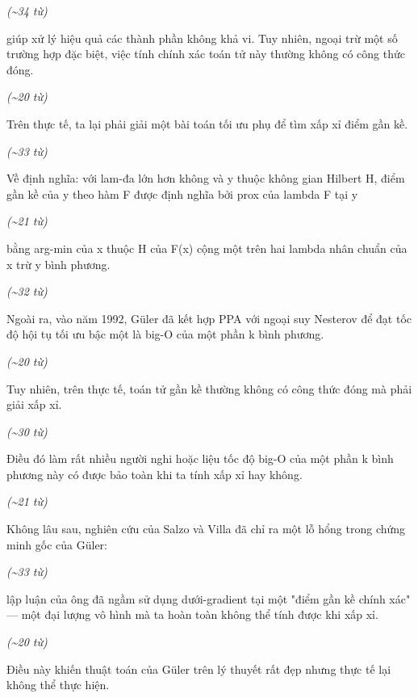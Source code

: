﻿\documentclass[12pt]{article}
\newenvironment{speech}{
    \normalsize
    \begin{list}{}{
        \leftmargin=1.25in
        \rightmargin=1.25in
        \parsep=0pt
        \topsep=0pt
        \partopsep=0pt
    }
    \item[]
}{
    \end{list}
    \vspace{6pt}
}
\newcommand{\block}[1]{
    \vspace{4pt}
    \noindent\hspace{1.5in}\textit{(\textasciitilde #1 từ)}
}
\begin{document}
\block{34}
\begin{speech}
    giúp xử lý hiệu quả các thành phần không khả vi. Tuy nhiên, ngoại trừ một số trường hợp đặc biệt, việc tính chính xác toán tử này thường không có công thức đóng.
\end{speech}

\block{20}
\begin{speech}
    Trên thực tế, ta lại phải giải một bài toán tối ưu phụ để tìm xấp xỉ điểm gần kề.
\end{speech}

\block{33}
\begin{speech}
    Về định nghĩa: với lam-đa lớn hơn không và y thuộc không gian Hilbert H, điểm gần kề của y theo hàm F được định nghĩa bởi prox của lambda F tại y
\end{speech}

\block{21}
\begin{speech}
    bằng arg-min của x thuộc H của F(x) cộng một trên hai lambda nhân chuẩn của x trừ y bình phương.
\end{speech}

\block{32}
\begin{speech}
    Ngoài ra, vào năm 1992, Güler đã kết hợp PPA với ngoại suy Nesterov để đạt tốc độ hội tụ tối ưu bậc một là big-O của một phần k bình phương.
\end{speech}

\block{20}
\begin{speech}
    Tuy nhiên, trên thực tế, toán tử gần kề thường không có công thức đóng mà phải giải xấp xỉ.
\end{speech}

\block{30}
\begin{speech}
    Điều đó làm rất nhiều người nghi hoặc liệu tốc độ big-O của một phần k bình phương này có được bảo toàn khi ta tính xấp xỉ hay không.
\end{speech}

\block{21}
\begin{speech}
    Không lâu sau, nghiên cứu của Salzo và Villa đã chỉ ra một lỗ hổng trong chứng minh gốc của Güler:
\end{speech}

\block{33}
\begin{speech}
    lập luận của ông đã ngầm sử dụng dưới-gradient tại một "điểm gần kề chính xác" — một đại lượng vô hình mà ta hoàn toàn không thể tính được khi xấp xỉ.
\end{speech}

\block{20}
\begin{speech}
    Điều này khiến thuật toán của Güler trên lý thuyết rất đẹp nhưng thực tế lại không thể thực hiện.
\end{speech}
\end{document}
